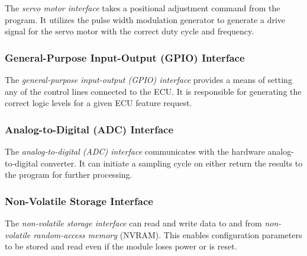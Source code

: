 The \emph{servo motor interface} takes a positional adjustment command from the program. It utilizes the pulse width modulation generator to generate a drive signal for the servo motor with the correct duty cycle and frequency.

\subsubsection{General-Purpose Input-Output (GPIO) Interface}
\label{sec:design_engine_gpio}

The \emph{general-purpose input-output (GPIO) interface} provides a means of setting any of the control lines connected to the ECU. It is responsible for generating the correct logic levels for a given ECU feature request.

\subsubsection{Analog-to-Digital (ADC) Interface} 
\label{sec:design_engine_adc}

The \emph{analog-to-digital (ADC) interface} communicates with the hardware analog-to-digital converter. It can initiate a sampling cycle on either return the results to the program for further processing.

\subsubsection{Non-Volatile Storage Interface}
\label{sec:design_engine_nvsi}

The \emph{non-volatile storage interface} can read and write data to and from \emph{non-volatile random-access memory} (NVRAM). This enables configuration parameters to be stored and read even if the module loses power or is reset.
